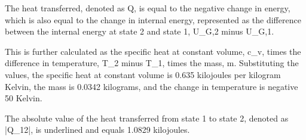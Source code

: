 The heat transferred, denoted as Q, is equal to the negative change in energy, which is also equal to the change in internal energy, represented as the difference between the internal energy at state 2 and state 1, U_G,2 minus U_G,1.

This is further calculated as the specific heat at constant volume, c_v, times the difference in temperature, T_2 minus T_1, times the mass, m. Substituting the values, the specific heat at constant volume is 0.635 kilojoules per kilogram Kelvin, the mass is 0.0342 kilograms, and the change in temperature is negative 50 Kelvin.

The absolute value of the heat transferred from state 1 to state 2, denoted as |Q_12|, is underlined and equals 1.0829 kilojoules.